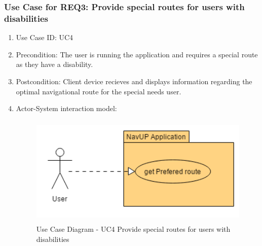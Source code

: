 \documentclass{article}
\begin{document}
		\subsubsection{Use Case for REQ3: Provide special routes for users with disabilities}
			\begin{enumerate}
			\renewcommand{\labelenumi}{{\textbf{\arabic{enumi}.}}}
			\item Use Case ID: UC4
			\item Precondition: The user is running the application and requires a special route as they have a disability.
			\item Postcondition: Client device recieves and displays information regarding the optimal navigational route for the special needs user.
			\item Actor-System interaction model:
				\graphicspath{ {./Diagrams/User/} }
				\begin{figure}[h]
				\caption{Use Case Diagram - UC4  Provide special routes for users with disabilities}
				\includegraphics[height = 200px]{getPreferedRoute.png}
				\end{figure}
			\end{enumerate}
\end{document}
